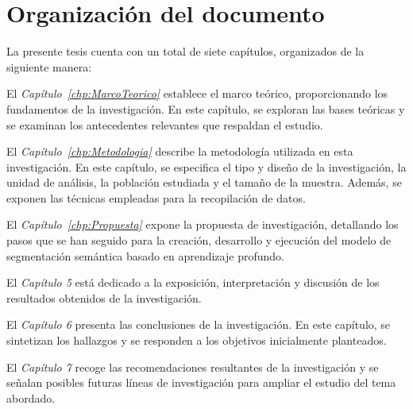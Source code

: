 \section{Organización del documento}
\label{sec:OrganizacionDocumento}

La presente tesis cuenta con un total de siete capítulos, organizados de la siguiente manera:

El \textit{Capítulo~\ref{chp:MarcoTeorico}} establece el marco teórico, proporcionando los fundamentos de la investigación. En este capítulo, se exploran las bases teóricas y se examinan los antecedentes relevantes que respaldan el estudio.

El \textit{Capítulo~\ref{chp:Metodologia}} describe la metodología utilizada en esta investigación. En este capítulo, se especifica el tipo y diseño de la investigación, la unidad de análisis, la población estudiada y el tamaño de la muestra. Además, se exponen las técnicas empleadas para la recopilación de datos.

El \textit{Capítulo~\ref{chp:Propuesta}} expone la propuesta de investigación, detallando los pasos que se han seguido para la creación, desarrollo y ejecución del modelo de segmentación semántica basado en aprendizaje profundo.

El \textit{Capítulo 5} está dedicado a la exposición, interpretación y discusión de los resultados obtenidos de la investigación.

El \textit{Capítulo 6} presenta las conclusiones de la investigación. En este capítulo, se sintetizan los hallazgos y se responden a los objetivos inicialmente planteados.

El \textit{Capítulo 7} recoge las recomendaciones resultantes de la investigación y se señalan posibles futuras líneas de investigación para ampliar el estudio del tema abordado.